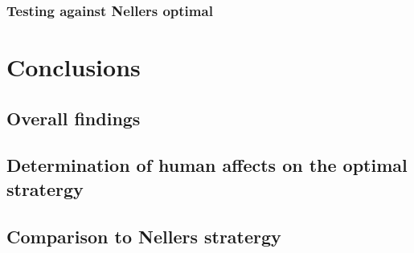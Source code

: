 \documentclass[a4paper,titlepage]{article}
\begin{document}
\subsubsection{Testing against Nellers optimal}


\section{Conclusions}
\subsection{Overall findings}
\subsection{Determination of human affects on the optimal stratergy}
\subsection{Comparison to Nellers stratergy}

\nocite{*}


\end{document}
